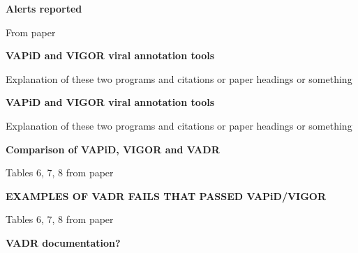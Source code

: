 \documentclass[landscape]{slides}
\begin{document}
\begin{slide}
\begin{center}
\textbf{Alerts reported}
\end{center}

From paper

\vfill
\end{slide}
\begin{slide}
\begin{center}
\textbf{VAPiD and VIGOR viral annotation tools}
\end{center}

Explanation of these two programs and citations or paper headings or
something

\vfill
\end{slide}
\begin{slide}
\begin{center}
\textbf{VAPiD and VIGOR viral annotation tools}
\end{center}

Explanation of these two programs and citations or paper headings or
something

\vfill
\end{slide}
\begin{slide}
\begin{center}
\textbf{Comparison of VAPiD, VIGOR and VADR}
\end{center}

Tables 6, 7, 8 from paper

\vfill
\end{slide}
\begin{slide}
\begin{center}
\textbf{EXAMPLES OF VADR FAILS THAT PASSED VAPiD/VIGOR}
\end{center}

Tables 6, 7, 8 from paper

\vfill
\end{slide}
\begin{slide}
\begin{center}
\textbf{VADR documentation?}
\end{center}

\vfill
\end{slide}
\end{document}

